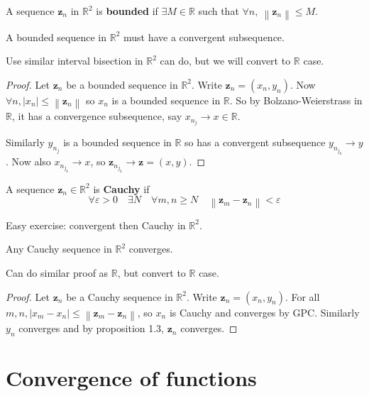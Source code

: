 \documentclass[a4paper]{article}
\renewcommand{\epsilon}{\varepsilon}
\begin{document}
\begin{definition}
    A sequence $\mathbf{z}_n$ in $ \mathbb{R}^{2} $ is \textbf{bounded} if $\exists M\in \mathbb{R}$ such that $ \forall n,\ \left\| \mathbf{z}_n \right\|\le M $. 
\end{definition}

\begin{theorem}
    A bounded sequence in $ \mathbb{R}^{2} $ must have a convergent subsequence.
\end{theorem}
Use similar interval bisection in $ \mathbb{R}^{2} $ can do, but we will convert to $\mathbb{R}$ case. 

\begin{proof}
    Let $ \mathbf{z}_n $ be a bounded sequence in $ \mathbb{R}^{2} $. Write $ \mathbf{z}_n = (x_n,y_n) $. Now $ \forall n, |x_n| \le \left\| \mathbf{z}_n \right\| $ so $x_n$ is a bounded sequence in $ \mathbb{R} $. So by Bolzano-Weierstrass in $ \mathbb{R} $, it has a convergence subsequence, say $ x_{n_j}\to x\in \mathbb{R} $. 

    Similarly $ y_{n_j} $ is a bounded sequence in $ \mathbb{R} $ so has a convergent subsequence $ y_{n_{j_k}}\to y $. Now also $ x_{n_{j_k}} \to x$, so $ \mathbf{z}_{n_{j_k}}\to \mathbf{z}= (x,y) $. 
\end{proof}

\begin{definition}
    A sequence $ \mathbf{z}_n\in \mathbb{R}^{2} $ is \textbf{Cauchy} if 
    \[
        \forall \epsilon>0\quad \exists N\quad \forall m,n\ge N\quad \left\| \mathbf{z}_m-\mathbf{z}_n \right\|<\epsilon
    \]
\end{definition}
Easy exercise: convergent then Cauchy in $ \mathbb{R}^{2} $. 

\begin{theorem}
    Any Cauchy sequence in $ \mathbb{R}^{2} $ converges. 
\end{theorem}
Can do similar proof as $\mathbb{R}$, but convert to $\mathbb{R}$ case. 
\begin{proof}
    Let $ \mathbf{z}_n $ be a Cauchy sequence in $ \mathbb{R}^{2} $. Write $ \mathbf{z}_n = (x_n,y_n) $. For all $ m,n, |x_m-x_n| \le \left\| \mathbf{z}_m-\mathbf{z}_n \right\| $, so $ x_n $ is Cauchy and converges by GPC. Similarly $ y_n $ converges and by proposition 1.3, $ \mathbf{z}_n $ converges.
\end{proof}

\section{Convergence of functions}
\end{document}

